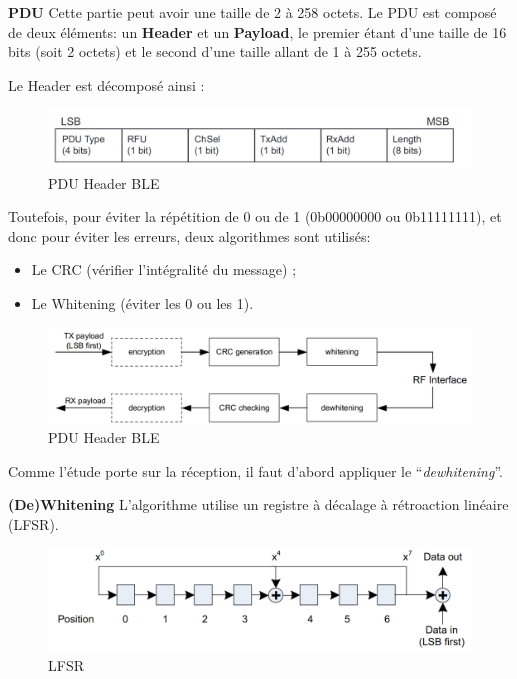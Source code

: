 \textbf{PDU} Cette partie peut avoir une taille de 2 à 258 octets. Le
PDU est composé de deux éléments: un \textbf{Header} et un
\textbf{Payload}, le premier étant d'une taille de 16 bits (soit 2
octets) et le second d'une taille allant de 1 à 255 octets.

Le Header est décomposé ainsi :

\begin{figure}
\centering
\includegraphics{static/header.png}
\caption{PDU Header BLE}
\end{figure}

Toutefois, pour éviter la répétition de 0 ou de 1 (0b00000000 ou
0b11111111), et donc pour éviter les erreurs, deux algorithmes sont
utilisés:

\begin{itemize}
\tightlist
\item
  Le CRC (vérifier l'intégralité du message) ;
\item
  Le Whitening (éviter les 0 ou les 1).
\end{itemize}

\begin{figure}
\centering
\includegraphics{static/process.png}
\caption{PDU Header BLE}
\end{figure}

Comme l'étude porte sur la réception, il faut d'abord appliquer le
``\emph{dewhitening}''.

\textbf{(De)Whitening} L'algorithme utilise un registre à décalage à
rétroaction linéaire (LFSR).

\begin{figure}
\centering
\includegraphics{static/lfsr.png}
\caption{LFSR}
\end{figure}

